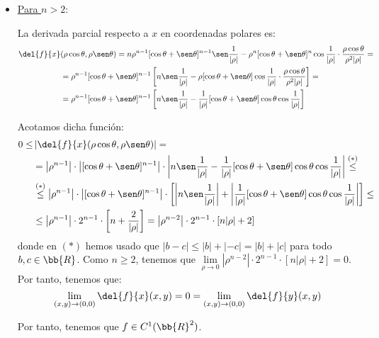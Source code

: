 \begin{ejercicio}
\begin{itemize}
\begin{itemize}
            \item \ul{Para $n>2$}:

            La derivada parcial respecto a $x$ en coordenadas polares es:
            \begin{equation*}\begin{split}
                \del{f}{x} &(\rho\cos\theta,\rho\sen\theta) = n\rho^{n-1} [\cos\theta +\sen\theta]^{n-1}\sen\dfrac{1}{|\rho|}  -\rho^{n} [\cos\theta +\sen\theta]^{n} \cos\dfrac{1}{|\rho|}\cdot \frac{\rho\cos\theta}{\rho^{2}|\rho|} =\\&
                = \rho^{n-1} [\cos\theta +\sen\theta]^{n-1}\left[n\sen\dfrac{1}{|\rho|}  -\rho [\cos\theta +\sen\theta] \cos\dfrac{1}{|\rho|}\cdot \frac{\rho\cos\theta}{\rho^2|\rho|}\right] =\\&
                = \rho^{n-1} [\cos\theta +\sen\theta]^{n-1}\left[n\sen\dfrac{1}{|\rho|}  -\frac{1}{|\rho|} [\cos\theta +\sen\theta] \cos\theta\cos\dfrac{1}{|\rho|}\right]
            \end{split}\end{equation*}

            Acotamos dicha función:
            \begin{equation*}\begin{split}
                0\leq &\left|\del{f}{x}(\rho\cos\theta,\rho\sen\theta)\right|
                =\\&= \left|\rho^{n-1}\right|\cdot \left|[\cos\theta +\sen\theta]^{n-1}\right|\cdot \left|n\sen\dfrac{1}{|\rho|}  -\frac{1}{|\rho|} [\cos\theta +\sen\theta] \cos\theta\cos\dfrac{1}{|\rho|}\right|
                \stackrel{(\ast)}{\leq}\\&\stackrel{(\ast)}{\leq}
                \left|\rho^{n-1}\right|\cdot \left|[\cos\theta +\sen\theta]^{n-1}\right|\cdot \left[\left|n\sen\dfrac{1}{|\rho|}\right|  +\left|\frac{1}{|\rho|} [\cos\theta +\sen\theta] \cos\theta\cos\dfrac{1}{|\rho|}\right|\right]
                \leq \\&\leq
                \left|\rho^{n-1}\right|\cdot 2^{n-1}\cdot \left[n  +\frac{2}{|\rho|}\right]
                = \left|\rho^{n-2}\right|\cdot 2^{n-1}\cdot \left[n|\rho|  +2\right]
            \end{split}\end{equation*}
            donde en $(\ast)$ hemos usado que $|b-c|\leq |b| + |-c| = |b| + |c|$ para todo $b,c\in \bb{R}$. Como $n\geq 2$, tenemos que $\lim\limits_{\rho\to 0}\left|\rho^{n-2}\right|\cdot 2^{n-1}\cdot \left[n|\rho|  +2\right] = 0$. Por tanto, tenemos que:
            \begin{equation*}
                \lim_{(x,y)\to (0,0)}\del{f}{x}(x,y) = 0 = \lim_{(x,y)\to (0,0)}\del{f}{y}(x,y)
            \end{equation*}

            Por tanto, tenemos que $f\in C^1(\bb{R}^2)$.
        \end{itemize}
    \end{itemize}
\end{ejercicio}

